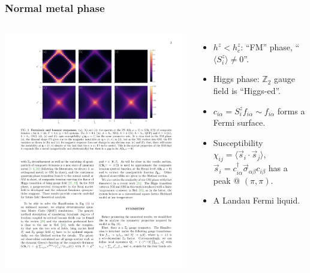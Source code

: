 \documentclass[xcolor=table, 10pt, aspectratio=43]{beamer}
\begin{document}
\begin{frame}
\frametitle{Normal metal phase}
\begin{columns}
\includegraphics[width=\columnwidth]{nm}
\begin{itemize}
\item $h^z < h_c^z$: ``FM'' phase, ``$\langle S_i^z\rangle\neq0$''.
\item Higgs phase: $\mathbb Z_2$ gauge field is ``Higgs-ed''.
\item $c_{i\alpha} = S_i^zf_{i\alpha}\sim f_{i\alpha}$ forms a Fermi surface.
\item Susceptibility
$\chi_{ij}=\langle \vec s_i\cdot\vec s_j\rangle$,
$\vec s_i=c_{i\alpha}^\dagger\vec\sigma_{\alpha\beta}c_{i\beta}$ has a peak @ $(\pi,\pi)$.
\item A Landau Fermi liquid.
\end{itemize}
\end{columns}
\end{frame}
\end{document}
